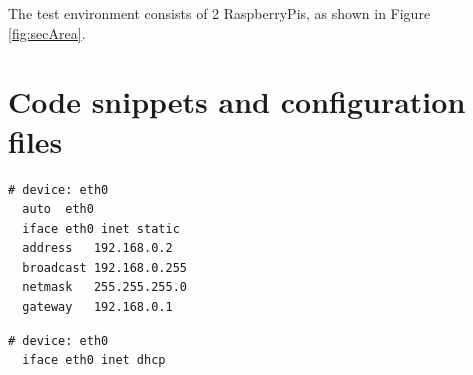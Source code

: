The test environment consists of 2 RaspberryPis, as shown in Figure \ref{fig:secArea}. 

\chapter{Code snippets and configuration files}

\begin{lstlisting}[style=BashInputStyle,caption={Raspbian configuration for static ip address},label=lst:staticIP]
# device: eth0
  auto  eth0
  iface eth0 inet static
  address   192.168.0.2
  broadcast 192.168.0.255
  netmask   255.255.255.0
  gateway   192.168.0.1
\end{lstlisting}

\begin{lstlisting}[style=BashInputStyle,caption={Raspbian configuration for dynamic ip address},label=lst:dynamicIP]
# device: eth0
  iface eth0 inet dhcp
\end{lstlisting}


